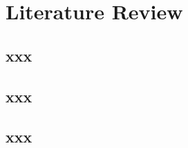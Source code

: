 \chapter{Literature Review}
\begingroup
\raggedright
{}
\setlength{\parskip}{0.5\baselineskip}
\titlespacing{\chapter}{0pt}{0pt}{0pt}
\titlespacing{\section}{0pt}{0pt}{0pt}

\section{xxx}
\section{xxx}
\section{xxx}

\endgroup